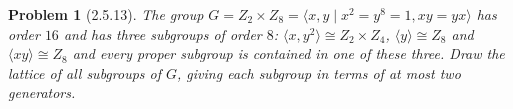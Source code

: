 \documentclass{article}
\newtheorem{problem}{Problem}
\begin{document}
\centerline{
}

\begin{problem}[2.5.13]
The group $G = Z_2 \times Z_8 = \langle x,y \mid x^2 = y^8 = 1, xy = yx \rangle$ has order $16$ and has three subgroups of order $8$: $\langle x, y^2 \rangle \cong Z_2 \times Z_4$, $\langle y \rangle \cong Z_8$ and $\langle xy \rangle \cong Z_8$ and every proper subgroup is contained in one of these three. Draw the lattice of all subgroups of $G$, giving each subgroup in terms of at most two generators.
\end{problem}

\centerline{
}
\end{document}
